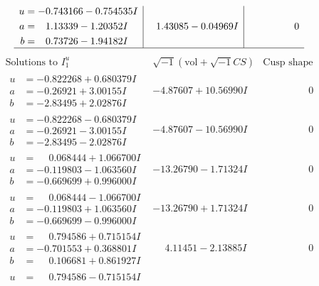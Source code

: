 \documentclass[1p]{elsarticle_modified}
\theoremstyle{definition}
\newcommand{\I}{\sqrt{-1}}
\begin{document}
$$\begin{array}{c|c|c}
\begin{aligned}
u &= -0.743166 - 0.754535 I \\
a &= \phantom{-}1.13339 - 1.20352 I \\
b &= \phantom{-}0.73726 - 1.94182 I\end{aligned}
 & \phantom{-}1.43085 - 0.04969 I & \phantom{-0.000000 } 0\\
 \hline 
 \end{array}$$\newpage$$\begin{array}{c|c|c}  
\text{Solutions to }I^u_{1}& \I (\text{vol} + \sqrt{-1}CS) & \text{Cusp shape}\\
 \hline 
\begin{aligned}
u &= -0.822268 + 0.680379 I \\
a &= -0.26921 + 3.00155 I \\
b &= -2.83495 + 2.02876 I\end{aligned}
 & -4.87607 + 10.56990 I & \phantom{-0.000000 } 0 \\ \hline\begin{aligned}
u &= -0.822268 - 0.680379 I \\
a &= -0.26921 - 3.00155 I \\
b &= -2.83495 - 2.02876 I\end{aligned}
 & -4.87607 - 10.56990 I & \phantom{-0.000000 } 0 \\ \hline\begin{aligned}
u &= \phantom{-}0.068444 + 1.066700 I \\
a &= -0.119803 - 1.063560 I \\
b &= -0.669699 + 0.996000 I\end{aligned}
 & -13.26790 - 1.71324 I & \phantom{-0.000000 } 0 \\ \hline\begin{aligned}
u &= \phantom{-}0.068444 - 1.066700 I \\
a &= -0.119803 + 1.063560 I \\
b &= -0.669699 - 0.996000 I\end{aligned}
 & -13.26790 + 1.71324 I & \phantom{-0.000000 } 0 \\ \hline\begin{aligned}
u &= \phantom{-}0.794586 + 0.715154 I \\
a &= -0.701553 + 0.368801 I \\
b &= \phantom{-}0.106681 + 0.861927 I\end{aligned}
 & \phantom{-}4.11451 - 2.13885 I & \phantom{-0.000000 } 0 \\ \hline\begin{aligned}
u &= \phantom{-}0.794586 - 0.715154 I \\

\end{aligned}
\end{array}$$
\end{document}
